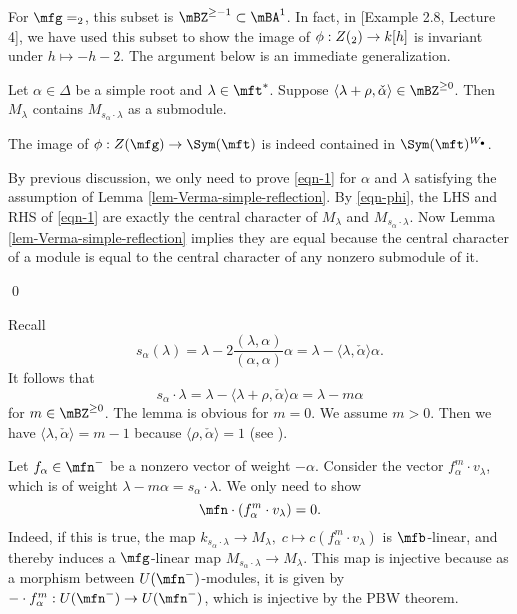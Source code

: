 	\begin{exam}
		For $\mfg=\sl_2$, this subset is $\mBZ^{\ge -1}\subset \mBA^1$. In fact, in [Example 2.8, Lecture 4], we have used this subset to show the image of $\phi:Z(\sl_2) \to k[h]$ is invariant under $h\mapsto -h-2$. The argument below is an immediate generalization.
	\end{exam}

	\begin{lem}
		\label{lem-Verma-simple-reflection}
		Let $\alpha\in \Delta$ be a simple root and $\lambda\in \mft^*$. Suppose $\langle \lambda+\rho, \check\alpha \rangle \in \mBZ^{\ge 0} $. Then $M_\lambda$ contains $M_{s_\alpha\cdot \lambda}$ as a submodule.
	\end{lem}

	\begin{cor}
		The image of $\phi: Z(\mfg)\to \Sym(\mft)$ is indeed contained in $\Sym(\mft)^{W_\bullet}$. 
	\end{cor}

	\proof
		By previous discussion, we only need to prove \eqref{eqn-1} for $\alpha$ and $\lambda$ satisfying the assumption of Lemma \ref{lem-Verma-simple-reflection}. By \eqref{eqn-phi}, the LHS and RHS of \eqref{eqn-1} are exactly the central character of $M_\lambda$ and $M_{s_\alpha\cdot \lambda}$. Now Lemma \ref{lem-Verma-simple-reflection} implies they are equal because the central character of a module is equal to the central character of any nonzero submodule of it.

	\qed

		Recall 
		\[
			s_\alpha(\lambda) = \lambda - 2\frac{(\lambda,\alpha)}{(\alpha,\alpha)}\alpha = \lambda - \langle \lambda,\check\alpha  \rangle \alpha.
		\]
		It follows that
		\[
			s_\alpha \cdot \lambda = \lambda - \langle \lambda+\rho, \check\alpha \rangle  \alpha  = \lambda - m\alpha
		\]
		for $m\in \mBZ^{\ge 0}$. The lemma is obvious for $m=0$. We assume $m>0$. Then we have $\langle \lambda,\check \alpha \rangle = m-1$ because $\langle \rho,\check\alpha \rangle = 1$ (see \cite[Cor. to Lem. 10.2(B)]{H1}).

		Let $f_\alpha\in \mfn^-$ be a nonzero vector of weight $-\alpha$. Consider the vector $f_\alpha^m \cdot v_\lambda$, which is of weight $\lambda-m\alpha=s_\alpha \cdot \lambda$. We only need to show
		\[
			\mfn \cdot (f_\alpha^m \cdot v_\lambda) =0.
		\]
		Indeed, if this is true, the map $k_{s_\alpha \cdot \lambda}\to M_\lambda,\; c\mapsto c(f_\alpha^m \cdot v_\lambda)$ is $\mfb$-linear, and thereby induces a $\mfg$-linear map $M_{s_\alpha\cdot \lambda}\to M_{\lambda}$. This map is injective because as a morphism between $U(\mfn^-)$-modules, it is given by $ -\cdot f_\alpha^m : U(\mfn^-) \to U(\mfn^-)$, which is injective by the PBW theorem.

